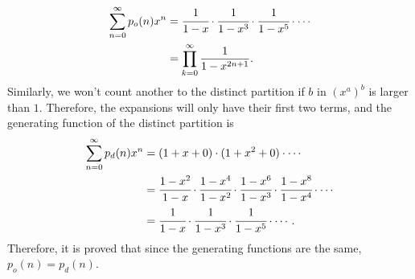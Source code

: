 \documentclass[aps,onecolumn,superscriptaddress,preprintnumbers]{revtex4-2}
\begin{document}
\begin{align}
\sum_{n=0}^{\infty}p_o(n)x^n &= \cfrac{1}{1-x}\cdot\cfrac{1}{1-x^3}\cdot\cfrac{1}{1-x^5}\cdot\cdots\notag\\
&=\prod_{k=0}^{\infty}\frac{1}{1-x^{2n+1}}.
\end{align}
Similarly, we won't count another to the distinct partition if $b$ in $(x^a)^b$ is larger than $1$. Therefore, the expansions will only have their first two terms, and the generating function of the distinct partition is 
\begin{align}
\sum_{n=0}^{\infty}p_d(n)x^n &= (1+x+0)\cdot(1+x^2+0)\cdot\cdots\notag\\
&=\cfrac{1-x^2}{1-x}\cdot\cfrac{1-x^4}{1-x^2}\cdot\cfrac{1-x^6}{1-x^3}\cdot\cfrac{1-x^8}{1-x^4}\cdot\cdots\\
&=\cfrac{1}{1-x}\cdot\cfrac{1}{1-x^3}\cdot\cfrac{1}{1-x^5}\cdot\cdots.\notag
\end{align}
Therefore, it is proved that since the generating functions are the same, $p_o(n)=p_d(n)$.
\end{document}
